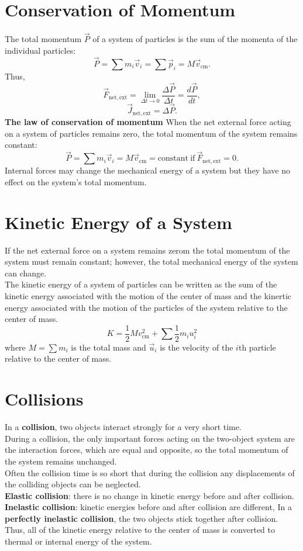 \documentclass[11pt,letterpaper]{report}
\begin{document}
\section{Conservation of Momentum}
The total momentum $\vec{P}$ of a system of particles is the sum of the momenta of the individual particles: $$\vec{P} = \sum m_i \vec{v}_i = \sum \vec{p}_i = M \vec{v}_\mathrm{cm}.$$
Thus, $$\vec{F}_\mathrm{net, ext} = \lim_{\Delta{t} \to 0}{\frac{\Delta{\vec{P}}}{\Delta{t}}} = \frac{d\vec{P}}{dt},$$ $$\vec{J}_\mathrm{net, ext} = \Delta{\vec{P}}.$$
\textbf{The law of conservation of momentum} When the net external force acting on a system of particles remains zero, the total momentum of the system remains constant: $$\vec{P} = \sum m_i \vec{v}_i = M \vec{v}_\mathrm{cm} = \mathrm{constant\ if\ } \vec{F}_\mathrm{net, ext} = 0.$$
Internal forces may change the mechanical energy of a system but they have no effect on the system's total momentum.


\section{Kinetic Energy of a System}
If the net external force on a system remains zerom the total momentum of the system must remain constant; however, the total mechanical energy of the system can change.
\\The kinetic energy of a system of particles can be written as the sum of the kinetic energy associated with the motion of the center of mass and the kinertic energy associated with the motion of the particles of the system relative to the center of mass.
$$K = \frac{1}{2} M v_\mathrm{cm}^2 + \sum \frac{1}{2} m_i u_i^2$$ where $M = \sum{m_i}$ is the total mass and $\vec{u}_i$ is the velocity of the $i$th particle relative to the center of mass.


\section{Collisions}
In a \textbf{collision}, two objects interact strongly for a very short time.
\\During a collision, the only important forces acting on the two-object system are the interaction forces, which are equal and opposite, so the total momentum of the system remains unchanged.
\\Often the collision time is so short that during the collision any displacements of the colliding objects can be neglected.
\\\textbf{Elastic collision}: there is no change in kinetic energy before and after collision.
\\\textbf{Inelastic collision}: kinetic energies before and after collision are different, In a \textbf{perfectly inelastic collision}, the two objects stick together after collision. Thus, all of the kinetic energy relative to the center of mass is converted to thermal or internal energy of the system.
\end{document}
